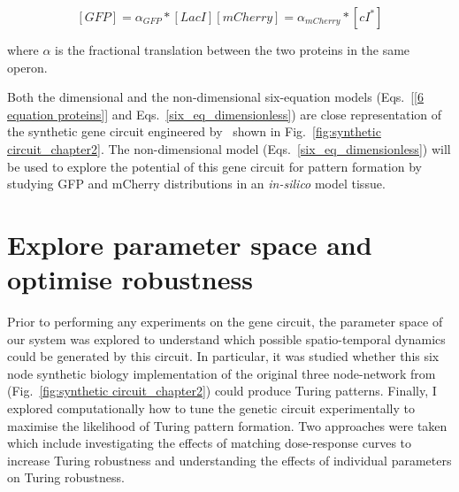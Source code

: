 \begin{subequations}
    \begin{equation}
        [GFP] = \alpha_{GFP}*[LacI]
    \end{equation}
    \begin{equation}
        [mCherry] = \alpha_{mCherry}*[cI^*]
    \end{equation}
    \label{linear_fluorescence}
\end{subequations}

where $\alpha$ is the fractional translation between the two proteins in the same operon.


Both the dimensional and the non-dimensional six-equation models
(Eqs.~\ref{[6 equation proteins]} and Eqs.~\ref{six_eq_dimensionless})
are close representation of the synthetic gene circuit engineered
by~\cite{Tica2020} shown in Fig.~\ref{fig:synthetic circuit_chapter2}.
The non-dimensional model (Eqs.~\ref{six_eq_dimensionless})
will be used to explore the potential of this gene circuit for pattern formation by studying GFP and mCherry distributions in an \textit{in-silico} model tissue.



\section{Explore parameter space and optimise robustness}
Prior to performing any experiments on the gene circuit,
the parameter space of our system was explored
to understand which possible spatio-temporal dynamics could be generated by this circuit.
In particular, it was studied
whether this six node synthetic biology implementation of the original three node-network from~\cite{Scholes2019} (Fig.~\ref{fig:synthetic circuit_chapter2}) could produce Turing patterns.
Finally,
I explored computationally
how to tune the genetic circuit experimentally to maximise the likelihood of Turing pattern formation.
Two approaches were taken
which include
investigating the effects of matching dose-response curves to increase Turing robustness
and understanding the effects of individual parameters on Turing robustness.

